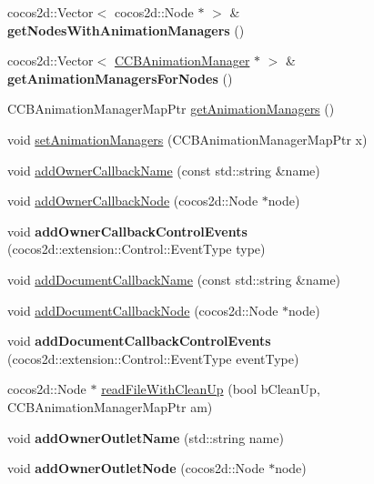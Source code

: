 \begin{DoxyCompactItemize}
\item 
\mbox{\label{classcocosbuilder_1_1CCBReader_a63dc0554b1c526354aaa7428ec5bba36}} 
cocos2d\+::\+Vector$<$ cocos2d\+::\+Node $\ast$ $>$ \& {\bfseries get\+Nodes\+With\+Animation\+Managers} ()
\item 
\mbox{\label{classcocosbuilder_1_1CCBReader_a692041cf262e17cc4e58fd01dce61154}} 
cocos2d\+::\+Vector$<$ \hyperlink{classcocosbuilder_1_1CCBAnimationManager}{C\+C\+B\+Animation\+Manager} $\ast$ $>$ \& {\bfseries get\+Animation\+Managers\+For\+Nodes} ()
\item 
C\+C\+B\+Animation\+Manager\+Map\+Ptr \hyperlink{classcocosbuilder_1_1CCBReader_a7e2bf8907f509dc3690e544911b217dd}{get\+Animation\+Managers} ()
\item 
void \hyperlink{classcocosbuilder_1_1CCBReader_adfce46f4628a398481896a7a6bd415be}{set\+Animation\+Managers} (C\+C\+B\+Animation\+Manager\+Map\+Ptr x)
\item 
void \hyperlink{classcocosbuilder_1_1CCBReader_a446402d89c52a9cd5f0ac017aeaafff0}{add\+Owner\+Callback\+Name} (const std\+::string \&name)
\item 
void \hyperlink{classcocosbuilder_1_1CCBReader_ae49813165f657e67e08253b86478d17c}{add\+Owner\+Callback\+Node} (cocos2d\+::\+Node $\ast$node)
\item 
\mbox{\label{classcocosbuilder_1_1CCBReader_ac0bdd5b2f90f0cd95d82bfc701c84099}} 
void {\bfseries add\+Owner\+Callback\+Control\+Events} (cocos2d\+::extension\+::\+Control\+::\+Event\+Type type)
\item 
void \hyperlink{classcocosbuilder_1_1CCBReader_a30939fd9e92943e77b15d3649ab98e15}{add\+Document\+Callback\+Name} (const std\+::string \&name)
\item 
void \hyperlink{classcocosbuilder_1_1CCBReader_ae7a7339510cc15950f11abdba201b7f9}{add\+Document\+Callback\+Node} (cocos2d\+::\+Node $\ast$node)
\item 
\mbox{\label{classcocosbuilder_1_1CCBReader_a2445f12728e6e7d942a98e4ff4350847}} 
void {\bfseries add\+Document\+Callback\+Control\+Events} (cocos2d\+::extension\+::\+Control\+::\+Event\+Type event\+Type)
\item 
cocos2d\+::\+Node $\ast$ \hyperlink{classcocosbuilder_1_1CCBReader_a1d7cbde04bea60afe12c9f8fb26c73bd}{read\+File\+With\+Clean\+Up} (bool b\+Clean\+Up, C\+C\+B\+Animation\+Manager\+Map\+Ptr am)
\item 
\mbox{\label{classcocosbuilder_1_1CCBReader_a0bd3083eb524193f379f2c7ed227e0c7}} 
void {\bfseries add\+Owner\+Outlet\+Name} (std\+::string name)
\item 
\mbox{\label{classcocosbuilder_1_1CCBReader_aa9fa80b734f08fc68c92c8971278fe5c}} 
void {\bfseries add\+Owner\+Outlet\+Node} (cocos2d\+::\+Node $\ast$node)
\end{DoxyCompactItemize}
